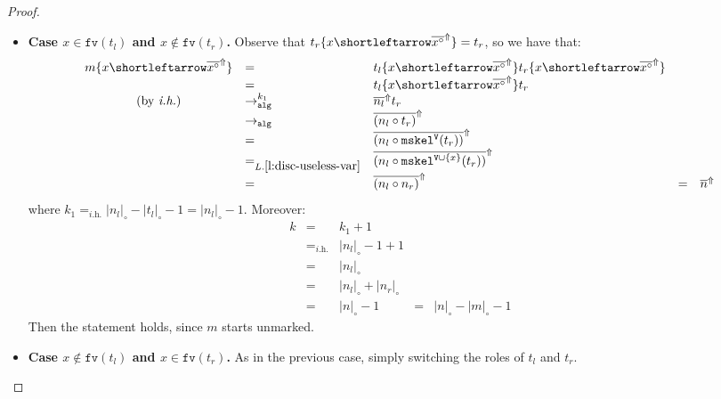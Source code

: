 \documentclass[10pt,a4paper]{article}
\theoremstyle{remark}
\newcommand{\tm}{t}
\newcommand{\var}{x}
\newcommand{\Rew}[1]{\rightarrow_{#1}}
\newcommand{\symfont}[1]{\mathtt{#1}}
\newcommand{\isub}[2]{\{#1{\shortleftarrow}#2\}}
\newcommand{\ih}{{\textit{i.h.}}\xspace}
\newcommand{\fv}[1]{\symfont{fv}(#1)}
\newcommand{\reflemmaeq}[1]{{L.\ref{l:#1}}}
\newcommand{\sizep}[2]{|#1|_{#2}}
\newcommand{\case}[1]{{\bf Case #1.}}
\newcommand{\taken}{\circ}
\newcommand{\frontiersym}{\Uparrow}
\newcommand{\skelu}[1]{\overline{#1}^{\frontiersym}}
\newcommand{\appt}{\taken}
\newcommand{\tomark}{\Rew{\symfont{alg}}}
\newcommand{\mtm}{m}
\newcommand{\mtmtwo}{n}
\newcommand{\disc}[2]{\symfont{disc}^{#2}(#1)}
\renewcommand{\disc}[2]{\symfont{mskel}^{#2}(#1)}
\newcommand{\skelvars}{\theta}
\renewcommand{\skelvars}{\symfont{V}}
\newcommand{\sizet}[1]{\sizep{#1}{\taken}}
\begin{document}
\begin{proof}
\begin{itemize}
\begin{itemize}
\item \case{$\var \in \fv{\tm_l}$ and $\var \notin \fv{\tm_r}$}
Observe that $\tm_r\isub\var{\skelu{\var^\taken}} = \tm_r$, so we have that:
\[\begin{array}{cllllll}
\mtm\isub\var{\skelu{\var^\taken}} &= &
  \tm_l\isub\var{\skelu{\var^\taken}} \tm_r\isub\var{\skelu{\var^\taken}} 
  \\
  &= &
  \tm_l\isub\var{\skelu{\var^\taken}} \tm_r
  \\
  \mbox{(by \ih)} &\tomark^{k_1} & 
  \skelu{\mtmtwo_l}  \tm_r 
  \\
  &\tomark&
   \skelu{(\mtmtwo_l \appt \tm_r)} 
   \\
  &=&
  \skelu{(\mtmtwo_l\appt\disc{\tm_r}\skelvars)} 
  \\
  &=_{\reflemmaeq{disc-useless-var}}&
  \skelu{(\mtmtwo_l\appt\disc{\tm_r}{\skelvars \cup \{\var\}})} 
  \\
  &=&\skelu{(\mtmtwo_l\appt\mtmtwo_r)} 
   &= &
   \skelu{\mtmtwo}
\end{array}\]
where $k_1 =_{\ih} \sizet{\mtmtwo_l} - \sizet{\tm_l} -1 = \sizet{\mtmtwo_l} -1$. Moreover:
\[\begin{array}{lllllll}
k & = & k_1 + 1
\\
& =_{\ih} & \sizet{\mtmtwo_l} -1 +1
\\
& = & \sizet{\mtmtwo_l}
\\
& = & \sizet{\mtmtwo_l} + \sizet{\mtmtwo_r}
\\
& = & \sizet{\mtmtwo} -1
%
& = & \sizet{\mtmtwo} - \sizet{\mtm} - 1
\end{array}\]
Then the statement holds, since $\mtm$ starts unmarked.


\item \case{$\var \notin \fv{\tm_l}$ and $\var \in \fv{\tm_r}$} As in the previous case, simply switching the roles of $\tm_l$ and $\tm_r$.
\end{itemize}




\end{itemize}
\end{proof}
\end{document}
